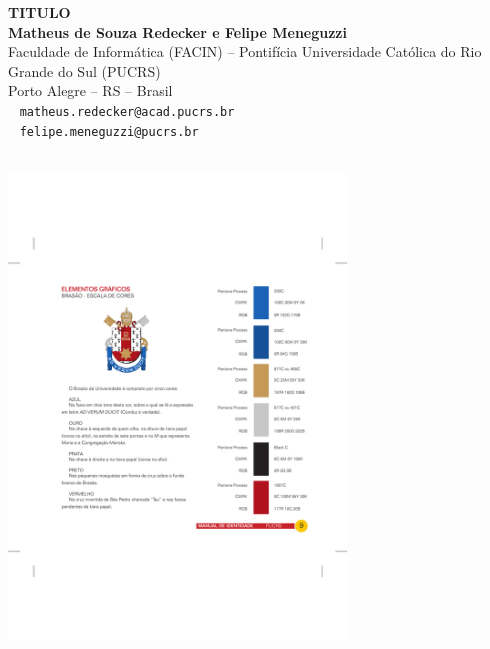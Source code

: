 \documentclass[a0,portrait]{a0poster}
\begin{document}
\begin{minipage}[b]{0.75\linewidth}
\veryHuge \color{NavyBlue} 
\textbf{TITULO} 
\color{Black}\\[2cm] %
\huge \textbf{Matheus de Souza Redecker e Felipe Meneguzzi}\\
\Large Faculdade de Inform\'atica (FACIN) -- 
Pontif\'icia Universidade Cat\'olica do Rio Grande do Sul (PUCRS)\\ 
Porto Alegre -- RS -- Brasil\\ %
\Large \Letter ~ \texttt{matheus.redecker@acad.pucrs.br}\\
\Large \Letter ~ \texttt{felipe.meneguzzi@pucrs.br}\\
\\
\end{minipage}
\hspace*{-2cm}
\begin{minipage}[t]{0.25\linewidth}
\begin{center}
\vspace{-12cm}
\includegraphics[width=9cm]{logoPUCRS.pdf}%
\hspace*{1cm}
\end{center}
\end{minipage}
\end{document}
